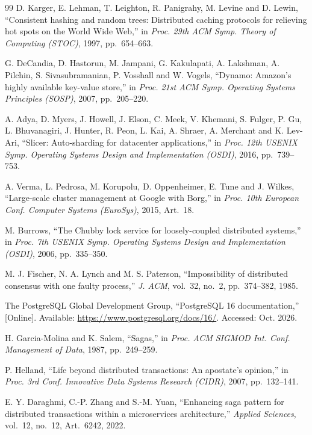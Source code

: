 \begin{singlespace}
\begin{thebibliography}{99}
D. Karger, E. Lehman, T. Leighton, R. Panigrahy, M. Levine and D. Lewin,
``Consistent hashing and random trees: Distributed caching protocols for
relieving hot spots on the World Wide Web,'' in \emph{Proc. 29th ACM Symp.
Theory of Computing (STOC)}, 1997, pp.~654--663.

G. DeCandia, D. Hastorun, M. Jampani, G. Kakulapati, A. Lakshman, A. Pilchin,
S. Sivasubramanian, P. Vosshall and W. Vogels, ``Dynamo: Amazon's highly
available key-value store,'' in \emph{Proc. 21st ACM Symp. Operating Systems
Principles (SOSP)}, 2007, pp.~205--220.

A. Adya, D. Myers, J. Howell, J. Elson, C. Meek, V. Khemani, S. Fulger, P. Gu,
L. Bhuvanagiri, J. Hunter, R. Peon, L. Kai, A. Shraer, A. Merchant and K. Lev-Ari,
``Slicer: Auto-sharding for datacenter applications,'' in \emph{Proc. 12th
USENIX Symp. Operating Systems Design and Implementation (OSDI)}, 2016,
pp.~739--753.

A. Verma, L. Pedrosa, M. Korupolu, D. Oppenheimer, E. Tune and J. Wilkes,
``Large-scale cluster management at Google with Borg,'' in \emph{Proc. 10th
European Conf. Computer Systems (EuroSys)}, 2015, Art.~18.

M. Burrows, ``The Chubby lock service for loosely-coupled distributed
systems,'' in \emph{Proc. 7th USENIX Symp. Operating Systems Design and
Implementation (OSDI)}, 2006, pp.~335--350.

M. J. Fischer, N. A. Lynch and M. S. Paterson, ``Impossibility of distributed
consensus with one faulty process,'' \emph{J. ACM}, vol.~32, no.~2,
pp.~374--382, 1985.

The PostgreSQL Global Development Group, ``PostgreSQL 16 documentation,''
[Online]. Available: \url{https://www.postgresql.org/docs/16/}. Accessed:
Oct. 2026.

H. Garcia-Molina and K. Salem, ``Sagas,'' in \emph{Proc. ACM SIGMOD Int. Conf.
Management of Data}, 1987, pp.~249--259.

P. Helland, ``Life beyond distributed transactions: An apostate's opinion,''
in \emph{Proc. 3rd Conf. Innovative Data Systems Research (CIDR)}, 2007,
pp.~132--141.

E. Y. Daraghmi, C.-P. Zhang and S.-M. Yuan, ``Enhancing saga pattern for
distributed transactions within a microservices architecture,'' \emph{Applied
Sciences}, vol.~12, no.~12, Art.~6242, 2022.


\end{thebibliography}
\end{singlespace}
